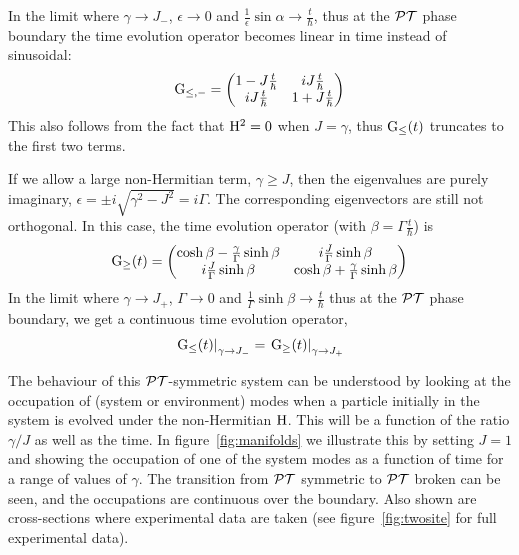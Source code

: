 In the limit where \( \gamma \rightarrow J_{-} \), \( \epsilon \rightarrow 0 \)
and \( \frac{1}{\epsilon} \sin \alpha \rightarrow \frac{t}{\hbar} \), thus at
the \(\mathcal{PT}{}\) phase boundary the time evolution operator becomes linear in time
instead of sinusoidal:
\begin{equation}
  \mathrm{G}_{\leq,-} = \begin{pmatrix}
    1-J\frac{t}{\hbar} & i J\frac{t}{\hbar} \\
    i J\frac{t}{\hbar} & 1+J\frac{t}{\hbar}
  \end{pmatrix}
\end{equation}
This also follows from the fact that \( \mathrm{H}^{2} = 0\) when \(J = \gamma\),
thus \( \mathrm{G}_{\leq} \!\left(t\right) \) truncates to the first two terms.

If we allow a large non-Hermitian term, \( \gamma \geq J \), then the
eigenvalues are purely imaginary, \( \epsilon = \pm i \sqrt{ \gamma^{2} - J^{2}
} = i \Gamma \). The corresponding eigenvectors are still not orthogonal. In
this case, the time evolution operator (with \( \beta = \Gamma \frac{t}{\hbar}
\)) is
\begin{equation}
  \mathrm{G}_{\geq} \!\left(t\right) = \begin{pmatrix}
    \cosh \beta - \frac{\gamma}{\Gamma} \sinh \beta &
    i \frac{J}{\Gamma} \sinh \beta \\
    i \frac{J}{\Gamma} \sinh \beta &
    \cosh \beta + \frac{\gamma}{\Gamma} \sinh \beta
  \end{pmatrix}
\end{equation}
In the limit where \( \gamma \rightarrow J_{+} \), \( \Gamma \rightarrow 0 \)
and \( \frac{1}{\Gamma} \sinh \beta \rightarrow \frac{t}{\hbar} \) thus at the
\(\mathcal{PT}{}\) phase boundary, we get a continuous time evolution operator,
\begin{equation}
  \left. \mathrm{G}_{\leq} \!\left(t\right) \right|_{\gamma \rightarrow J_{-}} = \left.
    \mathrm{G}_{\geq} \!\left(t\right) \right|_{\gamma \rightarrow J_{+}}
\end{equation}

The behaviour of this \(\mathcal{PT}{}\)-symmetric system can be understood by looking at
the occupation of (system or environment) modes when a particle initially in the
system is evolved under the non-Hermitian \(\mathrm{H}\). This will be a function
of the ratio \(\gamma/J\) as well as the time. In figure~\ref{fig:manifolds} we
illustrate this by setting \(J=1\) and showing the occupation of one of the
system modes as a function of time for a range of values of \(\gamma\). The
transition from \(\mathcal{PT}{}\) symmetric to \(\mathcal{PT}{}\) broken can be seen, and the
occupations are continuous over the boundary. Also shown are cross-sections
where experimental data are taken (see figure~\ref{fig:twosite} for full
experimental data).

